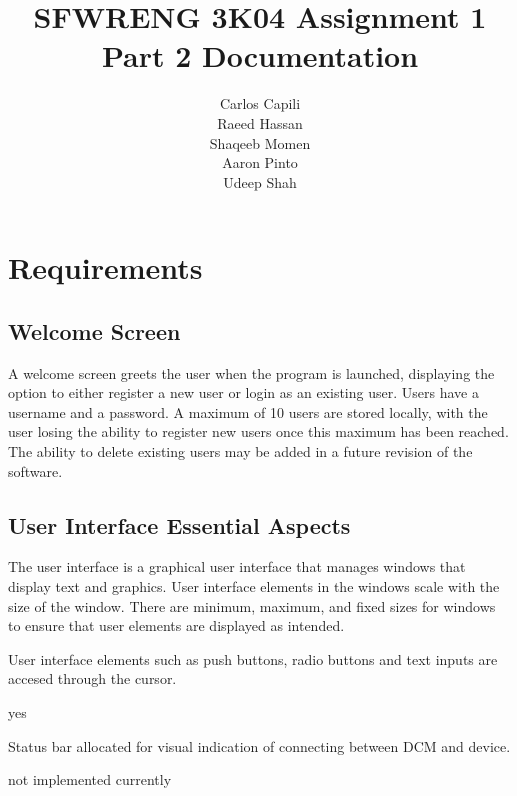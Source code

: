 \documentclass[12pt]{article}
\title{SFWRENG 3K04 Assignment 1 Part 2 Documentation}
\author{
    Carlos Capili \\
    Raeed Hassan \\
    Shaqeeb Momen \\
    Aaron Pinto \\
    Udeep Shah
}
\date{}
\begin{document}
\maketitle \newpage
\tableofcontents \newpage

\section{Requirements}
\subsection{Welcome Screen}
A welcome screen greets the user when the program is launched, displaying the option to either register a new user or login as an existing user. Users have a username and a password. A maximum of 10 users are stored locally, with the user losing the ability to register new users once this maximum has been reached. The ability to delete existing users may be added in a future revision of the software.

\subsection{User Interface Essential Aspects}
The user interface is a graphical user interface that manages windows that display text and graphics. User interface elements in the windows scale with the size of the window. There are minimum, maximum, and fixed sizes for windows to ensure that user elements are displayed as intended.

User interface elements such as push buttons, radio buttons and text inputs are accesed through the cursor.

yes

Status bar allocated for visual indication of connecting between DCM and device.

not implemented currently
\end{document}
